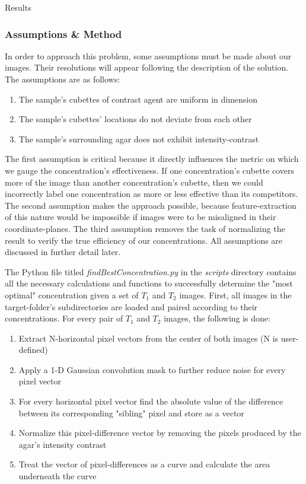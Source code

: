 \documentclass[a4paper,12pt]{article}
\begin{document}
\begin{section}{Results}
\subsubsection{Assumptions \& Method}

In order to approach this problem, some assumptions must be made about our images. Their resolutions will appear following the description of the solution. The assumptions are as follows:

\singlespacing
\begin{enumerate}
\item The sample's cubettes of contrast agent are uniform in dimension
\item The sample's cubettes' locations do not deviate from each other
\item The sample's surrounding agar does not exhibit intensity-contrast
\end{enumerate}
\doublespacing

The first assumption is critical because it directly influences the metric on which we gauge the concentration's effectiveness. If one concentration's cubette covers more of the image than another concentration's cubette, then we could incorrectly label one concentration as more or less effective than its competitors. The second assumption makes the approach possible, because feature-extraction of this nature would be impossible if images were to be misaligned in their coordinate-planes. The third assumption removes the task of normalizing the result to verify the true efficiency of our concentrations. All assumptions are discussed in further detail later.

The Python file titled {\em findBestConcentration.py} in the {\em scripts} directory contains all the necessary calculations and functions to successfully determine the "most optimal" concentration given a set of $T_1$ and $T_2$ images. First, all images in the target-folder's subdirectories are loaded and paired according to their concentrations. For every pair of $T_1$ and $T_2$ images, the following is done:

\singlespacing
\begin{enumerate}
\item Extract N-horizontal pixel vectors from the center of both images (N is user-defined)
\item Apply a 1-D Gaussian convolution mask to further reduce noise for every pixel vector
\item For every horizontal pixel vector find the absolute value of the difference between its corresponding "sibling" pixel and store as a vector
\item Normalize this pixel-difference vector by removing the pixels produced by the agar's intensity contrast
\item Treat the vector of pixel-differences as a curve and calculate the area underneath the curve
\end{enumerate}


\end{section}
\end{document}
